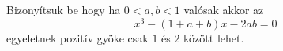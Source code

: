 Bizonyítsuk be hogy ha $0<a,b<1$ valósak akkor az 
$$
x^{3}-(1+a+b)x-2ab=0
$$
egyeletnek pozitív gyöke csak $1$ és $2$ között lehet.
